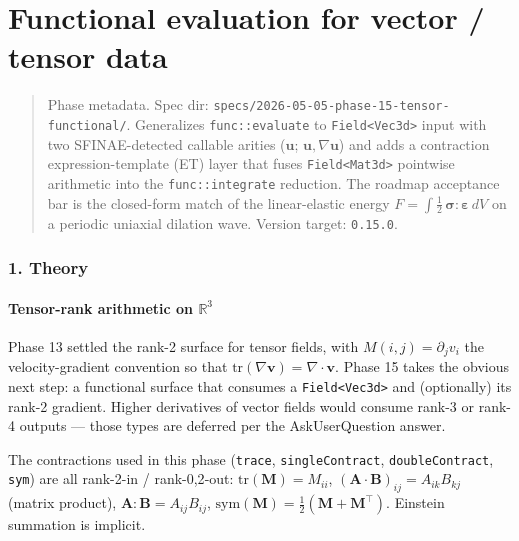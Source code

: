 \chapter{Functional evaluation for vector / tensor data}
\label{chap:dev:tensor-functional}

\begin{quote}
Phase metadata. Spec dir:
\passthrough{\lstinline!specs/2026-05-05-phase-15-tensor-functional/!}.
Generalizes \passthrough{\lstinline!func::evaluate!} to
\passthrough{\lstinline!Field<Vec3d>!} input with two SFINAE-detected
callable arities (\(\mathbf u\); \(\mathbf u, \nabla\mathbf u\)) and adds a
contraction expression-template (ET) layer that fuses
\passthrough{\lstinline!Field<Mat3d>!} pointwise arithmetic into the
\passthrough{\lstinline!func::integrate!} reduction. The roadmap
acceptance bar is the closed-form match of the linear-elastic energy
\(F = \int \tfrac12\,\boldsymbol{\sigma}\!:\!\boldsymbol{\varepsilon}\,dV\)
on a periodic uniaxial dilation wave. Version target:
\passthrough{\lstinline!0.15.0!}.
\end{quote}

\subsection{1. Theory}\label{phase15-theory}

\subsubsection{Tensor-rank arithmetic on \texorpdfstring{$\mathbb{R}^3$}{R3}}\label{phase15-rank}

Phase 13 settled the rank-2 surface for tensor fields, with
\(M(i, j) = \partial_j v_i\) the velocity-gradient convention so that
\(\mathrm{tr}(\nabla \mathbf v) = \nabla\!\cdot\!\mathbf v\). Phase 15
takes the obvious next step: a functional surface that consumes a
\passthrough{\lstinline!Field<Vec3d>!} and (optionally) its rank-2
gradient. Higher derivatives of vector fields would consume rank-3 or
rank-4 outputs --- those types are deferred per the AskUserQuestion
answer.

The contractions used in this phase
(\passthrough{\lstinline!trace!},
\passthrough{\lstinline!singleContract!},
\passthrough{\lstinline!doubleContract!},
\passthrough{\lstinline!sym!}) are all rank-2-in / rank-{0,2}-out:
\(\mathrm{tr}(\mathbf M) = M_{ii}\),
\((\mathbf A \cdot \mathbf B)_{ij} = A_{ik} B_{kj}\) (matrix product),
\(\mathbf A : \mathbf B = A_{ij} B_{ij}\),
\(\mathrm{sym}(\mathbf M) = \tfrac12(\mathbf M + \mathbf M^\top)\). Einstein
summation is implicit.

